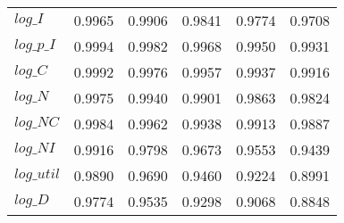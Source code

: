 \begin{center}
\begin{longtable}{lccccc}
$log\_I     $	 & 	    0.9965	 & 	    0.9906	 & 	    0.9841	 & 	    0.9774	 & 	    0.9708 \\ 
$log\_p\_I  $	 & 	    0.9994	 & 	    0.9982	 & 	    0.9968	 & 	    0.9950	 & 	    0.9931 \\ 
$log\_C     $	 & 	    0.9992	 & 	    0.9976	 & 	    0.9957	 & 	    0.9937	 & 	    0.9916 \\ 
$log\_N     $	 & 	    0.9975	 & 	    0.9940	 & 	    0.9901	 & 	    0.9863	 & 	    0.9824 \\ 
$log\_NC    $	 & 	    0.9984	 & 	    0.9962	 & 	    0.9938	 & 	    0.9913	 & 	    0.9887 \\ 
$log\_NI    $	 & 	    0.9916	 & 	    0.9798	 & 	    0.9673	 & 	    0.9553	 & 	    0.9439 \\ 
$log\_util  $	 & 	    0.9890	 & 	    0.9690	 & 	    0.9460	 & 	    0.9224	 & 	    0.8991 \\ 
$log\_D     $	 & 	    0.9774	 & 	    0.9535	 & 	    0.9298	 & 	    0.9068	 & 	    0.8848 \\ 
\end{longtable}
 \end{center}
